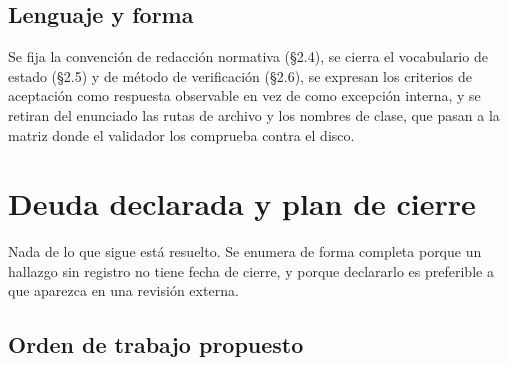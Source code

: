 \documentclass[11pt,a4paper]{article}
\begin{document}
\subsection{Lenguaje y forma}

Se fija la convención de redacción normativa (\S2.4), se cierra el vocabulario de estado
(\S2.5) y de método de verificación (\S2.6), se expresan los criterios de aceptación como
respuesta observable en vez de como excepción interna, y se retiran del enunciado las rutas de
archivo y los nombres de clase, que pasan a la matriz donde el validador los comprueba contra el
disco.

\section{Deuda declarada y plan de cierre}
\label{sec:pendientes}

Nada de lo que sigue está resuelto. Se enumera de forma completa porque un hallazgo sin registro
no tiene fecha de cierre, y porque declararlo es preferible a que aparezca en una revisión
externa.

\subsection{Orden de trabajo propuesto}
\end{document}
